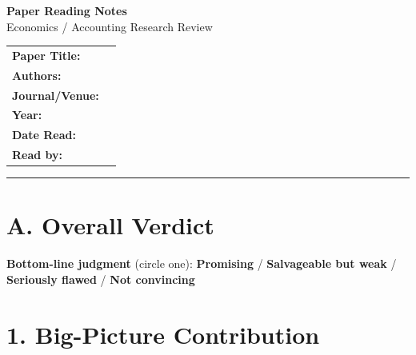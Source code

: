 \documentclass[11pt, letterpaper]{article}
\begin{document}
\begin{center}
  {\LARGE\bfseries Paper Reading Notes}\\[6pt]
  {\large\color{sectionblue} Economics / Accounting Research Review}\\[10pt]
  \begin{tabular}{ll}
    \textbf{Paper Title:}   & \underline{\hspace{10cm}} \\[4pt]
    \textbf{Authors:}       & \underline{\hspace{10cm}} \\[4pt]
    \textbf{Journal/Venue:} & \underline{\hspace{10cm}} \\[4pt]
    \textbf{Year:}          & \underline{\hspace{3cm}} \\[4pt]
    \textbf{Date Read:}     & \underline{\hspace{3cm}} \\[4pt]
    \textbf{Read by:}       & \underline{\hspace{6cm}} \\
  \end{tabular}
\end{center}

\vspace{0.5em}
\hrule
\vspace{1em}

\section*{A. Overall Verdict}

\begin{verdictbox}
\vspace{3cm}
\end{verdictbox}

\vspace{0.5em}
\textbf{Bottom-line judgment} (circle one):\quad
\textbf{Promising} \quad / \quad
\textbf{Salvageable but weak} \quad / \quad
\textbf{Seriously flawed} \quad / \quad
\textbf{Not convincing}

\section{1. Big-Picture Contribution}
\end{document}
